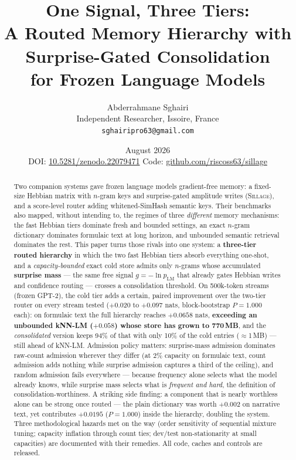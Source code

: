 \documentclass[11pt]{article}
\title{\bfseries One Signal, Three Tiers:\\
A Routed Memory Hierarchy with Surprise-Gated Consolidation\\
for Frozen Language Models}
\author{Abderrahmane Sghairi\\
\small Independent Researcher, Issoire, France\\
\small \texttt{sghairipro63@gmail.com}}
\date{August 2026\\[2pt]
\small DOI: \href{https://doi.org/10.5281/zenodo.22079471}{10.5281/zenodo.22079471}
\qquad Code: \href{https://github.com/riscoss63/sillage}{github.com/riscoss63/sillage}}
\newcommand{\sillage}{\textsc{Sillage}}
\begin{document}
\maketitle

\begin{abstract}
Two companion systems gave frozen language models gradient-free memory: a fixed-size Hebbian matrix with $n$-gram keys and surprise-gated amplitude writes (\sillage{}), and a score-level router adding whitened-SimHash semantic keys. Their benchmarks also mapped, without intending to, the regimes of three \emph{different} memory mechanisms: the fast Hebbian tiers dominate fresh and bounded settings, an exact $n$-gram dictionary dominates formulaic text at long horizon, and unbounded semantic retrieval dominates the rest. This paper turns those rivals into one system: a \textbf{three-tier routed hierarchy} in which the two fast Hebbian tiers absorb everything one-shot, and a \emph{capacity-bounded} exact cold store admits only $n$-grams whose accumulated \textbf{surprise mass} --- the same free signal $g = -\ln p_{\mathrm{LM}}$ that already gates Hebbian writes and confidence routing --- crosses a consolidation threshold. On 500k-token streams (frozen GPT-2), the cold tier adds a certain, paired improvement over the two-tier router on every stream tested ($+0.020$ to $+0.097$ nats, block-bootstrap $P = 1.000$ each): on formulaic text the full hierarchy reaches $+0.0658$ nats, \textbf{exceeding an unbounded kNN-LM ($+0.058$) whose store has grown to 770\,MB}, and the \emph{consolidated} version keeps 94\% of that with only 10\% of the cold entries ($\approx$1\,MB) --- still ahead of kNN-LM. Admission policy matters: surprise-mass admission dominates raw-count admission wherever they differ (at 2\% capacity on formulaic text, count admission adds nothing while surprise admission captures a third of the ceiling), and random admission fails everywhere --- because frequency alone selects what the model already knows, while surprise mass selects what is \emph{frequent and hard}, the definition of consolidation-worthiness. A striking side finding: a component that is nearly worthless alone can be strong once routed --- the plain dictionary was worth $+0.002$ on narrative text, yet contributes $+0.0195$ ($P=1.000$) inside the hierarchy, doubling the system. Three methodological hazards met on the way (order sensitivity of sequential mixture tuning; capacity inflation through count ties; dev/test non-stationarity at small capacities) are documented with their remedies. All code, caches and controls are released.
\end{abstract}
\end{document}
